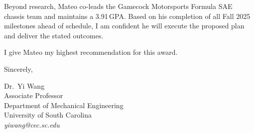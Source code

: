 \documentclass[12pt]{article}
\begin{document}
Beyond research, Mateo co-leads the Gamecock Motorsports Formula SAE chassis team and maintains a 3.91\,GPA. Based on his completion of all Fall 2025 milestones ahead of schedule, I am confident he will execute the proposed plan and deliver the stated outcomes.

I give Mateo my highest recommendation for this award.

\vspace{0.5em}

\noindent
Sincerely,

\vspace{0.8em}

\noindent
Dr.\ Yi Wang\\
Associate Professor\\
Department of Mechanical Engineering\\
University of South Carolina\\
\textit{yiwang@cec.sc.edu}
\end{document}
